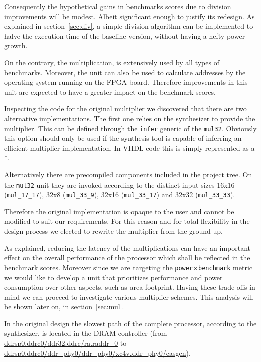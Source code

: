 Consequently the hypothetical gains in benchmarks scores due to division improvements will be modest. Albeit significant enough to justify its redesign. As explained in section~\ref{sec:div}, a simple division algorithm can be implemented to halve the execution time of the baseline version, without having a hefty power growth.

On the contrary, the multiplication, is extensively used by all types of benchmarks. Moreover, the unit can also be used to calculate addresses by the operating system running on the FPGA board. Therefore improvements in this unit are expected to have a greater impact on the benchmark scores. 

Inspecting the code for the original multiplier we discovered that there are two alternative implementations. The first one relies on the synthesizer to provide the multiplier. This can be defined through the \texttt{infer} generic of the \texttt{mul32}. Obviously this option should only be used if the synthesis tool is capable of inferring an efficient multiplier implementation. In VHDL code this is simply represented as a $*$.

Alternatively there are precompiled components included in the project tree. On the \texttt{mul32} unit they are invoked according to the distinct input sizes 16x16 (\texttt{mul\_17\_17}), 32x8 (\texttt{mul\_33\_9}), 32x16 (\texttt{mul\_33\_17}) and 32x32 (\texttt{mul\_33\_33}).

Therefore the original implementation is opaque to the user and cannot be modified to suit our requirements. For this reason and for total flexibility in the design process we elected to rewrite the multiplier from the ground up.

As explained, reducing the latency of the multiplications can have an important effect on the overall performance of the processor which shall be reflected in the benchmark scores. Moreover since we are targeting the \texttt{power$\times$benchmark} metric we would like to develop a unit that prioritizes performance and power consumption over other aspects, such as area footprint. Having these trade-offs in mind we can proceed to investigate various multiplier schemes. This analysis will be shown later on, in section~\ref{sec:mul}.

In the original design the slowest path of the complete processor, according to the synthesizer, is located in the DRAM controller (from \url{ddrsp0.ddrc0/ddr32.ddrc/ra.raddr_0} to \url{ddrsp0.ddrc0/ddr_phy0/ddr_phy0/xc4v.ddr_phy0/casgen}).

